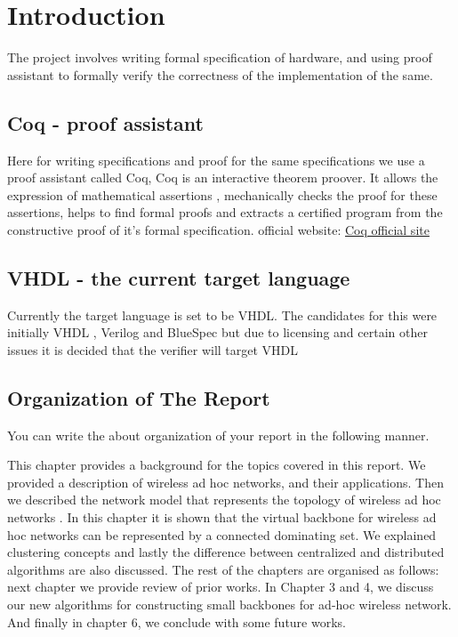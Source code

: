 \chapter{Introduction}
\hspace{3mm}
    The project involves writing formal specification of hardware, and using proof assistant to
formally verify the correctness of the implementation of the same.

\section{Coq -  proof assistant}
    Here for writing specifications and proof for the same specifications we use a proof assistant called
Coq, Coq is an interactive theorem proover. It allows the expression of mathematical assertions , mechanically
checks the proof for these assertions, helps to find formal proofs and extracts a certified program from the
constructive proof of it's formal specification. official website: \href{https://coq.inria.fr/}{Coq official site}

\section{VHDL -  the current target language}
    Currently the target language is set to be VHDL. The candidates for this were initially VHDL , Verilog
and BlueSpec but due to licensing and certain other issues it is decided that the verifier will target VHDL


\section{Organization of The Report}

You can write the about organization of your report in the following manner.

This chapter provides a background for the topics covered in this
report. We provided a description of wireless ad hoc networks, and
their applications. Then we described the network model that
represents the topology of wireless ad hoc networks \cite{Omar2016}. In this
chapter it is shown that the virtual backbone for wireless ad hoc
networks can be represented by a connected dominating set. We
explained clustering concepts and lastly the difference between
centralized and distributed algorithms are also discussed. The
rest of the chapters are organised as follows: next chapter we
provide review of prior works. In Chapter 3 and 4, we discuss our
new algorithms for constructing small backbones for ad-hoc
wireless network. And finally in chapter 6, we conclude with some
future works.

